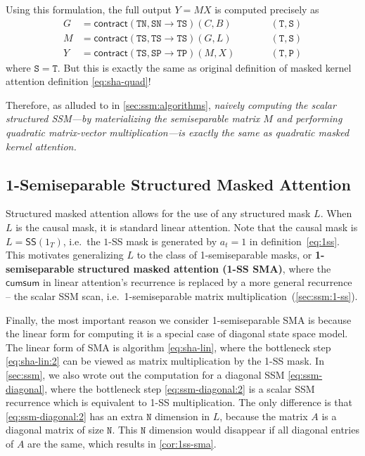 Using this formulation, the full output $Y=MX$ is computed precisely as
\begin{equation}
  \label{eq:ssm-quad}
  \begin{aligned}%
    G     & = \mathsf{contract}(\mathtt{TN, SN \to TS})(C, B) & & \qquad \mathtt{(T,S)} \\
    M     & = \mathsf{contract}(\mathtt{TS, TS \to TS})(G, L) & & \qquad \mathtt{(T,S)} \\
    Y     & = \mathsf{contract}(\mathtt{TS, SP \to TP})(M, X) & & \qquad \mathtt{(T,P)}
  \end{aligned}
\end{equation}
where $\mathtt{S}=\mathtt{T}$.
But this is exactly the same as original definition of masked kernel attention definition \eqref{eq:sha-quad}!

Therefore, as alluded to in \cref{sec:ssm:algorithms},
\emph{naively computing the scalar structured SSM---by materializing the semiseparable matrix $M$ and performing quadratic matrix-vector multiplication---is exactly the same as quadratic masked kernel attention.}

\subsection{1-Semiseparable Structured Masked Attention}
\label{sec:ssd:1ss-sma}

Structured masked attention allows for the use of any structured mask $L$.
When $L$ is the causal mask, it is standard linear attention.
Note that the causal mask is $L = \mathsf{SS}(1_T)$, i.e.\ the $1$-SS mask is generated by $a_t=1$ in definition~\eqref{eq:1ss}.
This motivates generalizing $L$ to the class of 1-semiseparable masks, or \textbf{1-semiseparable structured masked attention (1-SS SMA)},
where the $\mathsf{cumsum}$ in linear attention's recurrence is replaced by a more general recurrence -- the scalar SSM scan, i.e.\ 1-semiseparable matrix multiplication~(\cref{sec:ssm:1-ss}).




Finally, the most important reason we consider 1-semiseparable SMA is because the linear form for computing it is a special case of diagonal state space model.
The linear form of SMA is algorithm \eqref{eq:sha-lin}, where the bottleneck step \eqref{eq:sha-lin:2} can be viewed as matrix multiplication by the 1-SS mask.
In \cref{sec:ssm}, we also wrote out the computation for a diagonal SSM \eqref{eq:ssm-diagonal}, where the bottleneck step \eqref{eq:ssm-diagonal:2} is a scalar SSM recurrence which is equivalent to 1-SS multiplication.
The only difference is that \eqref{eq:ssm-diagonal:2} has an extra $\mathtt{N}$ dimension in $L$, because the matrix $A$ is a diagonal matrix of size $\mathtt{N}$.
This $\mathtt{N}$ dimension would disappear if all diagonal entries of $A$ are the same,
which results in \cref{cor:1ss-sma}.

